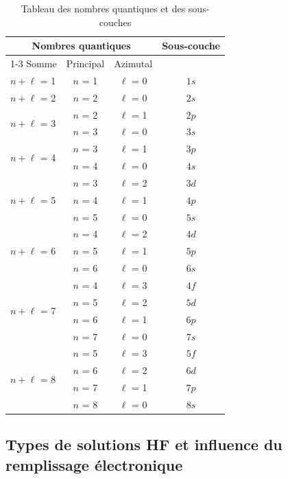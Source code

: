 \documentclass[12pt,a4paper]{article} %
\numberwithin{equation}{section} %
\numberwithin{figure}{section} %
\numberwithin{table}{section} %
\begin{document}
\begin{table}[h]
\centering
\begin{tabular}{|l|c|c|c|}
\hline
\multicolumn{3}{|c|}{Nombres quantiques} & \multirow[c]{2}{1in}{Sous-couche} \\
\cline{1-3}
Somme & Principal & Azimutal & \\
\hline
$n + \ell$ = 1 & $n$ = 1 & $\ell$ = 0 & $1s$ \\
\hline
$n + \ell$ = 2 & $n$ = 2 & $\ell$ = 0 & $2s$ \\
\hline
\multirow[c]{2}{1in}{$n + \ell$ = 3} & $n$ = 2 & $\ell$ = 1 & $2p$ \\
 & $n$ = 3 & $\ell$ = 0 & $3s$ \\
\hline
\multirow[c]{2}{1in}{$n + \ell$ = 4} & $n$ = 3 & $\ell$ = 1 & $3p$ \\
 & $n$ = 4 & $\ell$ = 0 & $4s$ \\
\hline
\multirow[c]{3}{1in}{$n + \ell$ = 5} & $n$ = 3 & $\ell$ = 2 & $3d$ \\
 & $n$ = 4 & $\ell$ = 1 & $4p$ \\
 & $n$ = 5 & $\ell$ = 0 & $5s$ \\
\hline
\multirow[c]{3}{1in}{$n + \ell$ = 6} & $n$ = 4 & $\ell$ = 2 & $4d$ \\
 & $n$ = 5 & $\ell$ = 1 & $5p$ \\
 & $n$ = 6 & $\ell$ = 0 & $6s$ \\
\hline
\multirow[c]{4}{1in}{$n + \ell$ = 7} & $n$ = 4 & $\ell$ = 3 & $4f$ \\
 & $n$ = 5 & $\ell$ = 2 & $5d$ \\
 & $n$ = 6 & $\ell$ = 1 & $6p$ \\
 & $n$ = 7 & $\ell$ = 0 & $7s$ \\
\hline
\multirow[c]{4}{1in}{$n + \ell$ = 8} & $n$ = 5 & $\ell$ = 3 & $5f$ \\
 & $n$ = 6 & $\ell$ = 2 & $6d$ \\
 & $n$ = 7 & $\ell$ = 1 & $7p$ \\
 & $n$ = 8 & $\ell$ = 0 & $8s$ \\
\hline
\end{tabular}
\caption{Tableau des nombres quantiques et des sous-couches}
\label{tab:nombresQuantiques}
\end{table}


\subsection{Types de solutions HF et influence du remplissage électronique}
\end{document}
